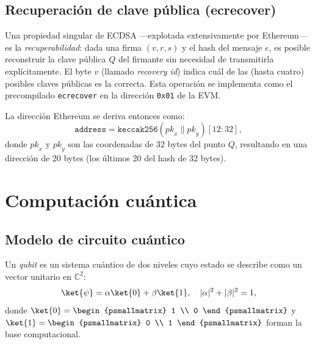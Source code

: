 \subsection{Recuperación de clave pública (ecrecover)}

Una propiedad singular de ECDSA ---explotada extensivamente por Ethereum--- es la \emph{recuperabilidad}: dada una firma $(v, r, s)$ y el hash del mensaje $e$, es posible reconstruir la clave pública $Q$ del firmante sin necesidad de transmitirla explícitamente. El byte $v$ (llamado \emph{recovery id}) indica cuál de las (hasta cuatro) posibles claves públicas es la correcta. Esta operación se implementa como el precompilado \texttt{ecrecover} en la dirección \texttt{0x01} de la EVM.

La dirección Ethereum se deriva entonces como:
\begin{equation}
  \texttt{address} = \texttt{keccak256}(\mathit{pk}_x \| \mathit{pk}_y)[12{:}32],
  \label{eq:eth_address}
\end{equation}
donde $\mathit{pk}_x$ y $\mathit{pk}_y$ son las coordenadas de 32 bytes del punto $Q$, resultando en una dirección de 20 bytes (los últimos 20 del hash de 32 bytes).


\section{Computación cuántica}
\label{sec:quantum}

\subsection{Modelo de circuito cuántico}

\begin{definicion}[Qubit]
Un \emph{qubit} es un sistema cuántico de dos niveles cuyo estado se describe como un vector unitario en $\mathbb{C}^2$:
\begin{equation}
  \ket{\psi} = \alpha\ket{0} + \beta\ket{1}, \quad |\alpha|^2 + |\beta|^2 = 1,
  \label{eq:qubit}
\end{equation}
donde $\ket{0} = \begin{psmallmatrix} 1 \\ 0 \end{psmallmatrix}$ y $\ket{1} = \begin{psmallmatrix} 0 \\ 1 \end{psmallmatrix}$ forman la base computacional.
\end{definicion}

